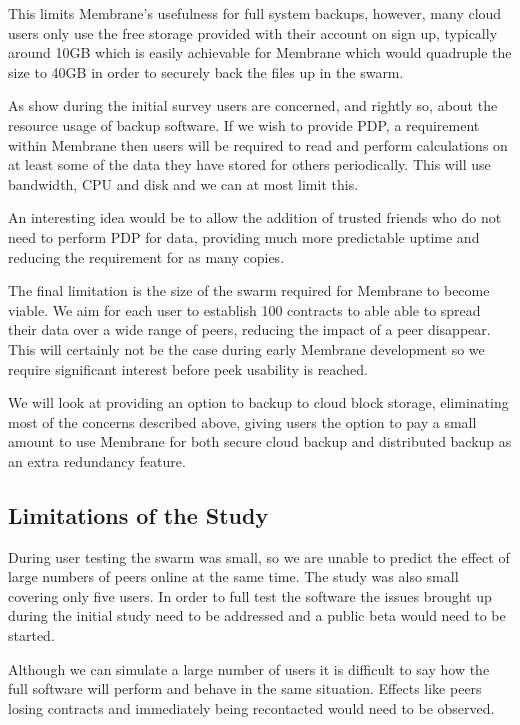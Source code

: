 \documentclass[11pt, a4paper, twoside]{report}
\begin{document}
This limits Membrane's usefulness for full system backups, however, many cloud users only use the free storage provided with their account on sign up, typically around 10GB which is easily achievable for Membrane which would quadruple the size to 40GB in order to securely back the files up in the swarm.

As show during the initial survey users are concerned, and rightly so, about the resource usage of backup software. If we wish to provide PDP, a requirement within Membrane then users will be required to read and perform calculations on at least some of the data they have stored for others periodically. This will use bandwidth, CPU and disk and we can at most limit this.

An interesting idea would be to allow the addition of trusted friends who do not need to perform PDP for data, providing much more predictable uptime and reducing the requirement for as many copies.

The final limitation is the size of the swarm required for Membrane to become viable. We aim for each user to establish 100 contracts to able able to spread their data over a wide range of peers, reducing the impact of a peer disappear. This will certainly not be the case during early Membrane development so we require significant interest before peek usability is reached.

We will look at providing an option to backup to cloud block storage, eliminating most of the concerns described above, giving users the option to pay a small amount to use Membrane for both secure cloud backup and distributed backup as an extra redundancy feature.

\subsection{Limitations of the Study}

During user testing the swarm was small, so we are unable to predict the effect of large numbers of peers online at the same time. The study was also small covering only five users. In order to full test the software the issues brought up during the initial study need to be addressed and a public beta would need to be started.

Although we can simulate a large number of users it is difficult to say how the full software will perform and behave in the same situation. Effects like peers losing contracts and immediately being recontacted would need to be observed.
\end{document}
